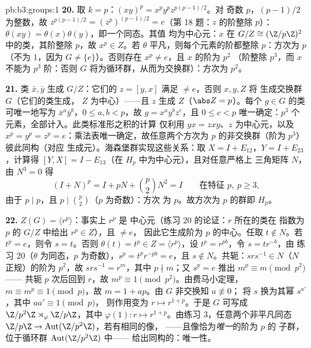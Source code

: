 \begin{solution}{pb:b3:groups:1}
\textbf{20.} 取 $k = p$：$(xy)^p = x^py^pz^{p(p-1)/2}$。对
奇数 $p$，$(p-1)/2$ 为整数，故 $z^{p(p-1)/2} =
(z^p)^{(p-1)/2} = e$（第 18 题：$z$ 的阶整除 $p$）：
$\theta(xy) = \theta(x)\theta(y)$，即一个同态。其值
均为中心元：$x$ 在 $G/Z \cong (\Z/p\Z)^2$ 中的类，其阶整除
$p$，故 $x^p \in Z$。若 $\theta$ 平凡，则每个元素的阶都整除
$p$：方次为 $p$（不为 $1$，因为 $G \neq
\{e\}$）。否则存在 $x^p \neq e$，且 $x$ 的阶为 $p^2$
（阶整除 $p^3$，而 $x$ 不能为 $p^3$ 阶：否则 $G$
将为循环群，从而为交换群）：方次为 $p^2$。

\textbf{21.} 类 $\bar x, \bar y$ 生成 $G/Z$：它们的
 $z = [y, x]$ 满足 $\neq e$，否则 $x, y, Z$ 将
生成交换群 $G$（它们的类生成，
$Z$ 为中心）——且 $z$ 生成 $Z$（$\abs Z = p$）。每个
$g \in G$ 的类可唯一地写为 $\bar x^a\bar y^b$，$0 \leq a, b <
p$，故 $g = x^ay^bz^c$，且 $0 \leq c < p$ 唯一确定：$p^3$
个元素，全部计入。此类标准形之积的计算
仅利用 $yx = zxy$、$z$ 为中心元，以及 $x^p = y^p =
z^p = e$：乘法表唯一确定，故任意两个方次为 $p$
的非交换群（阶为 $p^3$）彼此同构（对应
生成元）。海森堡群实现这些关系：取
$X = I + E_{12}$，$Y = I + E_{23}$，计算得 $[Y, X] = I -
E_{13}$（在 $H_p$ 中为中心元），且对任意严格上
三角矩阵 $N$，由 $N^3 = 0$ 得
\[
(I + N)^p = I + pN + \binom p2N^2 = I
\qquad\text{在特征 } p,\ p \geq 3,
\]
由于 $p \mid p$，且 $p \mid \binom p2$（$p$ 为奇数）：方次
为 $p$。故方次为 $p$ 的群即 $H_p$。

\textbf{22.} $Z(G) = \langle r^p\rangle$：事实上 $r^p$ 是
中心元（练习 20 的论证：$r$ 所在的类在
指数为 $p$ 的 $G/Z$ 中给出 $r^p \in Z$），且 $\neq e$，
因此它生成阶为 $p$ 的中心。任取 $t \notin N$。若
$t^p = e$，则令 $s = t$。否则 $\theta(t) = t^p \in Z =
\langle r^p\rangle$，设 $t^p = r^{pb}$，令 $s = tr^{-b}$，由
练习 20（$\theta$ 为同态，$p$ 为奇数），$s^p =
t^pr^{-pb} = e$，且 $s \notin N$。共轭：$srs^{-1} \in
N$（$N$ 正规）的阶为 $p^2$，故 $srs^{-1} = r^m$，其中 $p
\nmid m$；又 $s^p = e$ 推出 $m^p \equiv m \pmod{p^2}$——
共轭 $p$ 次后回到 $r$，故 $m^p \equiv 1 \pmod
{p^2}$。由费马小定理，$m \equiv m^p \equiv 1 \pmod p$，故 $m = 1 +
ap$。由 $G$ 非交换知 $a \not\equiv 0$；
将 $s$ 换为其幂 $s^{a'}$，其中 $aa' \equiv 1 \pmod p$，
则作用变为 $r \mapsto r^{1+p}$。于是 $G$ 可写成
$\Z/p^2\Z\rtimes_\varphi\Z/p\Z$，其中 $\varphi(1)\colon r
\mapsto r^{1+p}$。由练习 3，任意两个非平凡同态
$\Z/p\Z \to \operatorname{Aut}(\Z/p^2\Z)$，若有相同的像，
——且像恰为\emph{唯一}的阶为 $p$ 的
子群，位于循环群 $\operatorname{Aut}(\Z/p^2\Z)$ 中——
给出同构的：唯一性。


\end{solution}
